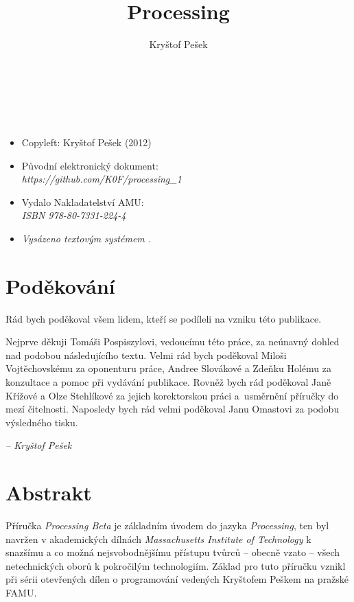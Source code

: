 \documentclass[10pt,twoside=true,open=right,cleardoublepage=empty,chapterprefix=true]{scrbook}
\title{Processing}
\author{Kryštof Pešek}
\date{} %
\newcommand{\oddilN}[1]{\section*{#1}\index{#1}\label{#1}}
\newcommand{\lnb}{\linebreak}
\newcommand{\nlb}{\linebreak}
\begin{document}
\pagestyle{empty}

\makeglossary\thispagestyle{empty}
\makeglossaries\thispagestyle{empty}





\newpage
\



\newpage
\ 


\vfill

\begin{itemize}
\item[] Copyleft: Kryštof Pešek (2012)
\item[]
Původní elektronický dokument: \\
{\em https://github.com/K0F/processing\_1}
\item[]
Vydalo Nakladatelství AMU: \\
{\em ISBN 978-80-7331-224-4}
\item[]
{\em Vysázeno textovým systémem \XeLaTeX.}



\end{itemize}

\newpage


\oddilN{Poděkování}
Rád bych poděkoval všem lidem, kteří se podíleli na vzniku této publikace.

Nejprve děkuji Tomáši Pospiszylovi, vedoucímu této práce, za neúnavný dohled nad podobou následujícího textu.  Velmi rád bych poděkoval Miloši \nlb Vojtěchovskému za oponenturu práce, Andree Slovákové a Zdeňku \lnb Holému za konzultace a pomoc při vydávání publikace. Rovněž bych rád poděkoval Janě Křížové a Olze Stehlíkové za jejich korektorskou práci a~usměrnění příručky do mezí čitelnosti. Naposledy bych rád velmi \lnb poděkoval Janu Omastovi za podobu výsledného tisku.


\vspace{5em}

\begin{flushright}
{\em \footnotesize{-- Kryštof Pešek}}
\end{flushright}

\vfill

\newpage

\oddilN{Abstrakt}

Příručka {\em Processing Beta} je základním úvodem do jazyka {\em Processing}, ten byl navržen v akademických dílnách {\em Massachusetts Institute of Technology} k snazšímu a co možná nejsvobodnějšímu přístupu tvůrců -- obecně \lnb vza\-to -- všech netechnických oborů k pokročilým technologiím. Základ pro tuto příručku vznikl při sérii otevřených dílen o programování vedených Kryštofem Peškem na pražské FAMU.
\end{document}
